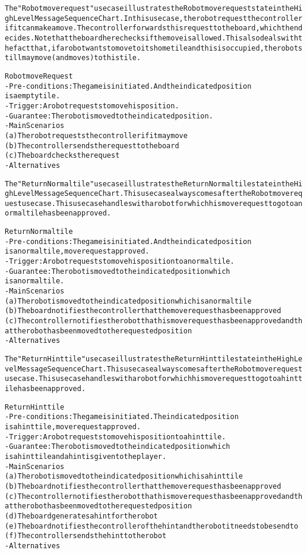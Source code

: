 \begin{alltt}
The "Robot move request" use case illustrates the Robot move request state in the High Level Message Sequence Chart. In this use case, the robot request the controller if it can make a move. The controller forwards this request to the board, which then decides. Note that the board here checks if the move is allowed. This also deals with the fact that, if a robot wants to move to its home tile and this is occupied, the robot still may move (and moves) to this tile.

Robot move Request
- Pre-conditions: The game is initiated. And the indicated position
    is a empty tile.
- Trigger: A robot requests to move his position.
- Guarantee: The robot is moved to the indicated position.
- Main Scenarios
    (a) The robot requests the controller if it may move
    (b) The controller sends the request to the board
    (c) The board checks the request
- Alternatives

The "Return Normal tile" use case illustrates the Return Normal tile state in the High Level Message Sequence Chart. This use case always comes after the Robot move request use case. This use case handles with a robot for which his move request to go to a normal tile has been approved.

Return Normal tile
- Pre-conditions: The game is initiated. And the indicated position
    is a normal tile, move request approved.
- Trigger: A robot requests to move his position to a normal tile.
- Guarantee: The robot is moved to the indicated position which
    is a normal tile.
- Main Scenarios
    (a) The robot is moved to the indicated position which is a normal tile
    (b) The board notifies the controller that the move request has been approved
    (c) The controller notifies the robot that his move request has been approved and that the robot has been moved to the requested position
- Alternatives

The "Return Hint tile" use case illustrates the Return Hint tile state in the High Level Message Sequence Chart. This use case always comes after the Robot move request use case. This use case handles with a robot for which his move request to go to a hint tile has been approved.

Return Hint tile
- Pre-conditions: The game is initiated. The indicated position
    is a hint tile, move request approved.
- Trigger: A robot requests to move his position to a hint tile.
- Guarantee: The robot is moved to the indicated position which
    is a hint tile and a hint is given to the player.
- Main Scenarios
    (a) The robot is moved to the indicated position which is a hint tile 
    (b) The board notifies the controller that the move request has been approved
    (c) The controller notifies the robot that his move request has been approved and that the robot has been moved to the requested position
    (d) The board generates a hint for the robot
    (e) The board notifies the controller of the hint and the robot it needs to be send to
    (f) The controller sends the hint to the robot
- Alternatives


\end{alltt}
